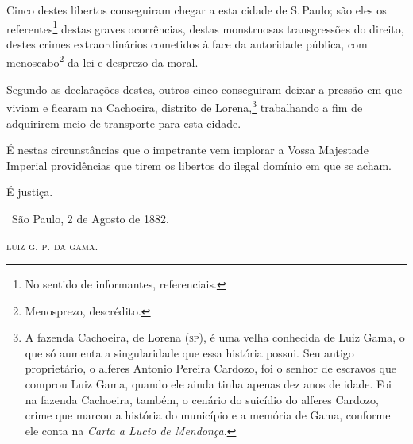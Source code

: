 Cinco destes libertos conseguiram chegar a esta cidade de S.\,Paulo; são
eles os referentes\footnote{No sentido de informantes, referenciais.}
destas graves ocorrências, destas monstruosas transgressões do direito,
destes crimes extraordinários cometidos à face da autoridade pública,
com menoscabo\footnote{Menosprezo, descrédito.} da lei e desprezo da
moral.

Segundo as declarações destes, outros cinco conseguiram deixar a pressão
em que viviam e ficaram na Cachoeira, distrito de Lorena,\footnote{A
  fazenda Cachoeira, de Lorena (\textsc{sp}), é uma velha conhecida de Luiz Gama,
  o que só aumenta a singularidade que essa história possui. Seu antigo
  proprietário, o alferes Antonio Pereira Cardozo, foi o senhor de
  escravos que comprou Luiz Gama, quando ele ainda tinha apenas dez anos
  de idade. Foi na fazenda Cachoeira, também, o cenário do suicídio do
  alferes Cardozo, crime que marcou a história do município e a memória
  de Gama, conforme ele conta na \emph{Carta a Lucio de Mendonça}.}
trabalhando a fim de
adquirirem meio de transporte para esta cidade.

É nestas circunstâncias que o impetrante vem implorar a Vossa Majestade
Imperial providências que tirem os libertos do ilegal domínio em que se
acham.

É justiça.

\bigskip

\hfill\ São Paulo, 2 de Agosto de 1882.

\hfill\textsc{luiz g. p. da gama.}

\asterisc
